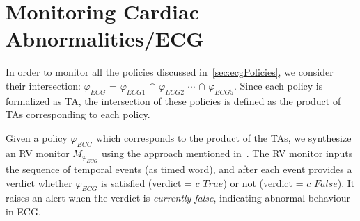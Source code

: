\section{Monitoring Cardiac Abnormalities/ECG}
In order to monitor all the policies discussed in~\autoref{sec:ecgPolicies}, we consider their intersection:  $\varphi_{ECG}$ = $\varphi_{ECG1}$ $\cap$ $\varphi_{ECG2}$ $\cdots$ $\cap$ $\varphi_{ECG5}$. Since each policy is formalized as TA, the intersection of these policies is defined as the product of TAs corresponding to each policy.

Given a policy $\varphi_{ECG}$ which corresponds to the product of the TAs, we synthesize an RV monitor $M_{\varphi_{ECG}}$ using the approach mentioned in~\cite{pinisetty2017predictive,pinisetty2018security,Bauer:2011:RVL}. The RV monitor inputs the sequence of temporal events (as timed word), and after each event provides a verdict whether $\varphi_{ECG}$ is satisfied (verdict = $c\_True$) or not (verdict = $c\_False$). It raises an alert when the verdict is \emph{currently false}, indicating abnormal behaviour in ECG.

